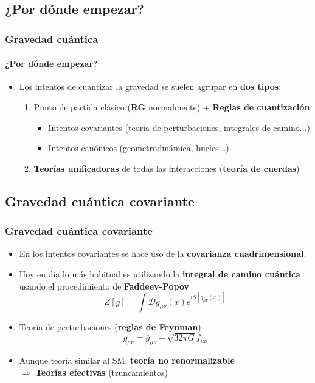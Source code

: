 \documentclass{beamer}
\begin{document}
\subsection{¿Por dónde empezar?}
\begin{frame}
\frametitle{Gravedad cuántica}
\framesubtitle{¿Por dónde empezar?}
\begin{itemize}
  \item Los intentos de cuantizar la gravedad se suelen agrupar en \textbf{dos tipos}:
  \begin{enumerate}
    \item Punto de partida clásico (\textbf{RG} normalmente) + \textbf{Reglas de cuantización}
    \begin{itemize}
     \item Intentos covariantes (teoría de perturbaciones, integrales de camino...)
     \item Intentos canónicos (geometrodinámica, bucles...)
    \end{itemize}
    \item \textbf{Teorías unificadoras} de todas las interacciones (\textbf{teoría de cuerdas})
  \end{enumerate}
\end{itemize}
\end{frame}

\subsection{Gravedad cuántica covariante}
\begin{frame}
\frametitle{Gravedad cuántica covariante}
\begin{itemize}
  \item En los intentos covariantes se hace uso de la \textbf{covarianza cuadrimensional}.
  \item Hoy en día lo más habitual es utilizando la \textbf{integral de camino cuántica} usando el procedimiento de \textbf{Faddeev-Popov}
  \begin{equation*}
   Z[g]=\int\mathscr{D}g_{\mu\nu}(x)e^{iS[g_{\mu\nu}(x)]}
  \end{equation*}
  \item Teoría de perturbaciones (\textbf{reglas de Feynman})
  \begin{equation*}
  g_{\mu\nu}=\bar{g}_{\mu\nu}+\sqrt{32\pi G}f_{\mu\nu}
  \end{equation*}
  \item Aunque teoría similar al SM, \textbf{teoría no renormalizable} \\ $\Rightarrow$ \textbf{Teorías efectivas} (truncamientos)
\end{itemize}
\end{frame}
\end{document}
